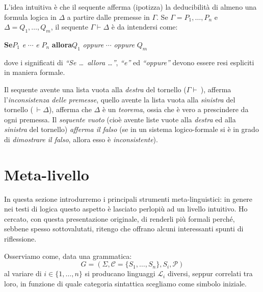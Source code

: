 \documentclass[12pt,a4paper,openright,twoside]{report}
\begin{document}
L'idea intuitiva \`e che il sequente afferma (ipotizza) la deducibilit\`a di almeno una formula logica in $\Delta$ a partire dalle premesse in $\Gamma$. Se $\Gamma = P_1, \ldots, P_n$ e $\Delta = Q_1, \ldots, Q_m$, il sequente $\Gamma \vdash \Delta$ \`e da intendersi come:
\begin{center}
	\textbf{Se}\quad $P_1$ \emph{e} $\cdots$ \emph{e} $P_n$ \quad\textbf{allora}\quad $Q_1$ \emph{oppure} $\cdots$ \emph{oppure} $Q_m$
\end{center}
dove i significati di \emph{``Se \ldots~allora \ldots''}, \emph{``e''} ed \emph{``oppure''} devono essere resi espliciti in maniera formale.

Il sequente avente una lista vuota alla \emph{destra} del tornello ($\Gamma \vdash ~$), afferma l'\emph{inconsistenza delle premesse}, quello avente la lista vuota alla \emph{sinistra} del tornello ($~ \vdash \Delta$), afferma che $\Delta$ \`e un \emph{teorema}, ossia che \`e vero a prescindere da ogni premessa. Il \emph{sequente vuoto} (cio\`e avente liste vuote alla \emph{destra} ed alla \emph{sinistra} del tornello) \emph{afferma il falso} (se in un sistema logico-formale si \`e in grado di \emph{dimostrare il falso}, allora esso \`e \emph{inconsistente}).


\section{Meta-livello} 

In questa sezione introdurremo i principali strumenti meta-linguistici: in genere nei testi di logica questo aspetto \`e lasciato perlopi\`u ad un livello intuitivo. Ho cercato, con questa presentazione originale, di renderli pi\`u formali perch\'e, sebbene spesso sottovalutati, ritengo che offrano alcuni interessanti spunti di riflessione.

Osserviamo come, data una grammatica:
$$
	G = (\Sigma, \mathcal{C} = \{ S_1, \ldots, S_n \}, S_i, \mathcal{P})
$$
al variare di $i \in \{ 1, \ldots, n \}$ si producano linguaggi $\mathscr{L}_i$ diversi, seppur correlati tra loro, in funzione di quale categoria sintattica scegliamo come simbolo iniziale.
\end{document}
